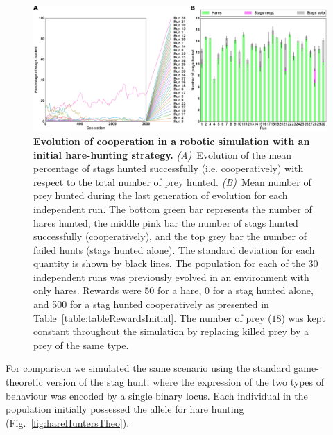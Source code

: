     \begin{figure}[h]
      \centerfloat
        \includegraphics[scale = 1.0]{fig/ArticleBio1/Fig3.png}
      \caption{\textbf{Evolution of cooperation in a robotic simulation with an initial hare-hunting strategy.} 
      {\em (A)}~Evolution of the mean percentage of stags hunted successfully (i.e. cooperatively) with respect to the total number of prey hunted. {\em (B)}~Mean number of prey hunted during the last generation of evolution for each independent run. The bottom green bar represents the number of hares hunted, the middle pink bar the number of stags hunted successfully (cooperatively), and the top grey bar the number of failed hunts (stags hunted alone). The standard deviation for each quantity is shown by black lines. The population for each of the 30 independent runs was previously evolved in an environment with only hares. Rewards were 50 for a hare, 0 for a stag hunted alone, and 500 for a stag hunted cooperatively as presented in Table~\ref{table:tableRewardsInitial}. The number of prey ($18$) was kept constant throughout the simulation by replacing killed prey by a prey of the same type.}
      \label{fig:hareHuntersRob}
    \end{figure}

    For comparison we simulated the same scenario using the standard game-theoretic version of the stag hunt, where the expression of the two types of behaviour was encoded by a single binary locus. Each individual in the population initially possessed the allele for hare hunting (Fig.~\ref{fig:hareHuntersTheo}).

